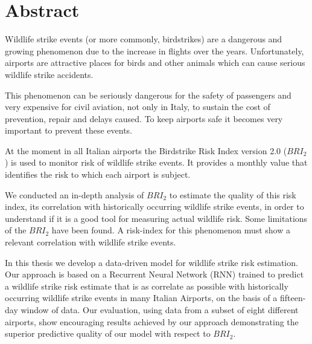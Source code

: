 \chapter*{Abstract}
Wildlife strike events (or more commonly, birdstrikes) are a dangerous and growing phenomenon due to the increase in flights over the years. Unfortunately, airports are attractive places for birds and other animals which can cause serious wildlife strike accidents.

This phenomenon can be seriously dangerous for the safety of passengers and very expensive for civil aviation, not only in Italy, to sustain the cost of prevention, repair and delays caused.
To keep airports safe it becomes very important to prevent these events.

At the moment in all Italian airports the Birdstrike Risk Index version 2.0 ($BRI_2$) is used to monitor risk of wildlife strike events. It provides a monthly value that identifies the risk to which each airport is subject. 

We conducted an in-depth analysis of $BRI_2$ to estimate the quality of this risk index, its correlation with historically occurring wildlife strike events, in order to understand if it is a good tool for measuring actual wildlife risk.
Some limitations of the $BRI_2$ have been found. A risk-index for this phenomenon must show a relevant correlation with wildlife strike events. 

In this thesis we develop a data-driven model for wildlife strike risk estimation. Our approach is based on a Recurrent Neural Network (RNN) trained to predict a wildlife strike risk estimate that is as correlate as possible with historically occurring wildlife strike events in many Italian Airports, on the basis of a fifteen-day window of data.
Our evaluation, using data from a subset of eight different airports, show encouraging results achieved by our approach demonstrating the superior predictive quality of our model with respect to $BRI_2$.